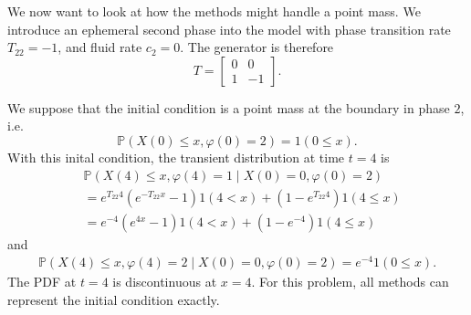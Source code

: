 \begin{example}
	We now want to look at how the methods might handle a point mass. We introduce an ephemeral second phase into the model with phase transition rate \(T_{22}=-1\), and fluid rate \(c_2=0\). The generator is therefore 
	\[T=\left[\begin{array}{cc} 0 & 0 \\ 1 & -1 \end{array}\right].\]

	We suppose that the initial condition is a point mass at the boundary in phase \(2\), i.e.~
	\[\mathbb P(X(0)\leq x, \varphi(0)=2)=1(0\leq x).\] 
	With this inital condition, the transient distribution at time \(t=4\) is 
	\begin{align}
		&\mathbb P(X(4)\leq x,\varphi(4)=1 \mid X(0)=0,\varphi(0)=2) \nonumber 
		\\&= e^{T_{22}4}\left(e^{-T_{22}x}-1\right)1(4< x) + (1-e^{T_{22}4})1(4\leq x) \nonumber
		\\&= e^{-4}\left(e^{4x}-1\right)1(4< x) + (1-e^{-4})1(4\leq x) \label{eqn: asjda}
	\end{align}
	and 
	\begin{align}
		\mathbb P(X(4)\leq x,\varphi(4)=2 \mid X(0)=0,\varphi(0)=2) = e^{-4}1(0\leq x).
	\end{align}
	The PDF at \(t=4\) is discontinuous at \(x=4\). For this problem, all methods can represent the initial condition exactly. 


\end{example}
